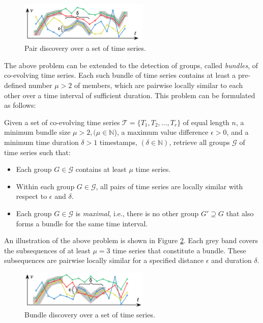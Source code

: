 \begin{figure}[!tb]
    \centering
    \includegraphics[width=0.55\textwidth]{figures/sim_join.png}
    \caption{Pair discovery over a set of time series.}
    \label{fig:sim_join}
\end{figure}

The above problem can be extended to the detection of groups, called \textit{bundles}, of co-evolving time series. Each such bundle of time series contains at least a pre-defined number $\mu>2$ of members, which are pairwise locally similar to each other over a time interval of sufficient duration. This problem can be formulated as follows:

\begin{problem}
Given a set of co-evolving time series $\mathcal{T}=\{T_1,T_2,...,T_r\}$ of equal length $n$, a minimum bundle size $\mu > 2, (\mu \in \mathbb{N}$), a maximum value difference $\epsilon>0$, and a minimum time duration $\delta>1$ timestamps, $(\delta \in \mathbb{N})$, retrieve all groups $\mathcal{G}$ of time series such that:
\begin{itemize}
    \item Each group $G \in \mathcal{G}$ contains at least $\mu$ time series.
    \item Within each group $G \in \mathcal{G}$, all pairs of time series are locally similar with respect to $\epsilon$ and $\delta$.
    \item Each group $G \in \mathcal{G}$ is \textit{maximal}, i.e., there is no other group $G' \supseteq G$ that also forms a bundle for the same time interval. 
\end{itemize}
\end{problem}

An illustration of the above problem is shown in Figure \ref{fig:bundle_disc}. Each grey band covers the subsequences of at least $\mu=3$ time series that constitute a bundle. These subsequences are pairwise locally similar for a specified distance $\epsilon$ and duration $\delta$.

\begin{figure}[!tb]
    \centering
    \includegraphics[width=0.55\textwidth]{figures/bundle_disc.png}
    \caption{Bundle discovery over a set of time series.}
    \label{fig:bundle_disc}
\end{figure}